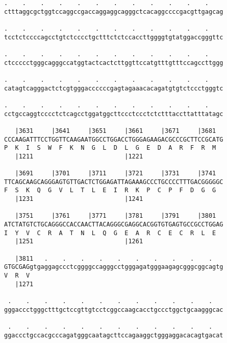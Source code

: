 \documentclass{article}
\begin{document}
\begin{Verbatim}
.    .    .    .    .    .    .    .    .    .    .    .    
ctttaggcgctggtccaggccgaccaggaggcagggctcacaggccccgacgttgagcag
                                                            
.    .    .    .    .    .    .    .    .    .    .    .    
tcctctccccagcctgtctcccctgctttctctccaccttggggtgtatggaccgggttc
                                                            
.    .    .    .    .    .    .    .    .    .    .    .    
ctccccctgggcagggccatggtactcactcttggttccatgtttgtttccagccttggg
                                                            
.    .    .    .    .    .    .    .    .    .    .    .    
catagtcagggactctcgtgggaccccccgagtagaaacacagatgtgtctccctgggtc
                                                            
.    .    .    .    .    .    .    .    .    .    .    .    
cctgccaggtcccctctcagcctggatggcttccctccctctctttaccttatttatagc
                                                            
   |3631     |3641     |3651     |3661     |3671     |3681  
CCCAAGATTTCCTGGTTCAAGAATGGCCTGGACCTGGGAGAAGACGCCCGCTTCCGCATG
P  K  I  S  W  F  K  N  G  L  D  L  G  E  D  A  R  F  R  M  
   |1211                         |1221                      
  
   |3691     |3701     |3711     |3721     |3731     |3741  
TTCAGCAAGCAGGGAGTGTTGACTCTGGAGATTAGAAAGCCCTGCCCCTTTGACGGGGGC
F  S  K  Q  G  V  L  T  L  E  I  R  K  P  C  P  F  D  G  G  
   |1231                         |1241                      
  
   |3751     |3761     |3771     |3781     |3791     |3801  
ATCTATGTCTGCAGGGCCACCAACTTACAGGGCGAGGCACGGTGTGAGTGCCGCCTGGAG
I  Y  V  C  R  A  T  N  L  Q  G  E  A  R  C  E  C  R  L  E  
   |1251                         |1261                      
  
   |3811   .    .    .    .    .    .    .    .    .    .   
GTGCGAGgtgaggagccctcggggccagggcctgggagatgggaagagcgggcggcagtg
V  R  V                                                     
   |1271                                                    
  
 .    .    .    .    .    .    .    .    .    .    .    .   
gggaccctgggctttgctccgttgtcctcggccaagcacctgccctggctgcaagggcac
                                                            
 .    .    .    .    .    .    .    .    .    .    .    .   
ggaccctgccacgcccagatgggcaatagcttccagaaggctgggaggacacagtgacat
                                                            

\end{Verbatim}
\end{document}
